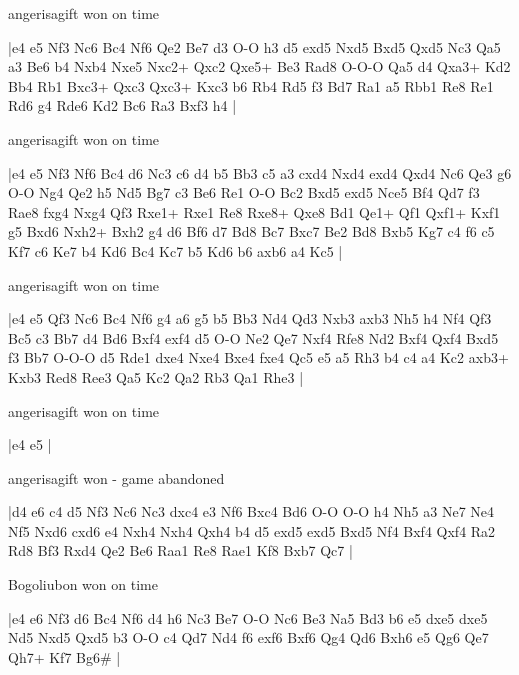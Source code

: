 \showboard

angerisagift won on time

\makegametitle
|e4 e5 Nf3 Nc6 Bc4 Nf6 Qe2 Be7 d3 O-O h3 d5 exd5 Nxd5 Bxd5 Qxd5 Nc3 Qa5 a3 Be6 b4 Nxb4 Nxe5 Nxc2+ Qxc2 Qxe5+ Be3 Rad8 O-O-O Qa5 d4 Qxa3+ Kd2 Bb4 Rb1 Bxc3+ Qxc3 Qxc3+ Kxc3 b6 Rb4 Rd5 f3 Bd7 Ra1 a5 Rbb1 Re8 Re1 Rd6 g4 Rde6 Kd2 Bc6 Ra3 Bxf3 h4  |

\showboard

angerisagift won on time

\makegametitle
|e4 e5 Nf3 Nf6 Bc4 d6 Nc3 c6 d4 b5 Bb3 c5 a3 cxd4 Nxd4 exd4 Qxd4 Nc6 Qe3 g6 O-O Ng4 Qe2 h5 Nd5 Bg7 c3 Be6 Re1 O-O Bc2 Bxd5 exd5 Nce5 Bf4 Qd7 f3 Rae8 fxg4 Nxg4 Qf3 Rxe1+ Rxe1 Re8 Rxe8+ Qxe8 Bd1 Qe1+ Qf1 Qxf1+ Kxf1 g5 Bxd6 Nxh2+ Bxh2 g4 d6 Bf6 d7 Bd8 Bc7 Bxc7 Be2 Bd8 Bxb5 Kg7 c4 f6 c5 Kf7 c6 Ke7 b4 Kd6 Bc4 Kc7 b5 Kd6 b6 axb6 a4 Kc5  |

\showboard

angerisagift won on time

\makegametitle
|e4 e5 Qf3 Nc6 Bc4 Nf6 g4 a6 g5 b5 Bb3 Nd4 Qd3 Nxb3 axb3 Nh5 h4 Nf4 Qf3 Bc5 c3 Bb7 d4 Bd6 Bxf4 exf4 d5 O-O Ne2 Qe7 Nxf4 Rfe8 Nd2 Bxf4 Qxf4 Bxd5 f3 Bb7 O-O-O d5 Rde1 dxe4 Nxe4 Bxe4 fxe4 Qc5 e5 a5 Rh3 b4 c4 a4 Kc2 axb3+ Kxb3 Red8 Ree3 Qa5 Kc2 Qa2 Rb3 Qa1 Rhe3  |

\showboard

angerisagift won on time

\makegametitle
|e4 e5  |

\showboard

angerisagift won - game abandoned

\makegametitle
|d4 e6 c4 d5 Nf3 Nc6 Nc3 dxc4 e3 Nf6 Bxc4 Bd6 O-O O-O h4 Nh5 a3 Ne7 Ne4 Nf5 Nxd6 cxd6 e4 Nxh4 Nxh4 Qxh4 b4 d5 exd5 exd5 Bxd5 Nf4 Bxf4 Qxf4 Ra2 Rd8 Bf3 Rxd4 Qe2 Be6 Raa1 Re8 Rae1 Kf8 Bxb7 Qc7  |

\showboard

Bogoliubon won on time

\makegametitle
|e4 e6 Nf3 d6 Bc4 Nf6 d4 h6 Nc3 Be7 O-O Nc6 Be3 Na5 Bd3 b6 e5 dxe5 dxe5 Nd5 Nxd5 Qxd5 b3 O-O c4 Qd7 Nd4 f6 exf6 Bxf6 Qg4 Qd6 Bxh6 e5 Qg6 Qe7 Qh7+ Kf7 Bg6\#  |


